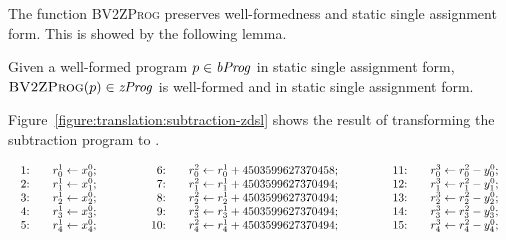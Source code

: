 The function \textsc{BV2ZProg} preserves well-formedness and static single assignment form. This is showed by the following lemma.

\begin{lemma}
  \label{lemma:bv2z-prog}
  Given a well-formed program $p \in \mathit{bProg}$ in static single assignment form, $\textsc{BV2ZProg}(p) \in \mathit{zProg}$ is well-formed and in static single assignment form.
\end{lemma}

Figure~\ref{figure:translation:subtraction-zdsl} shows the result of transforming the subtraction program  to \zdsl.

\begin{figure*}
  \centering
  $
  \begin{array}{lclcl}
    \begin{array}{rcl}
    \textmd{1:} && {r}^1_0 \leftarrow {x}^0_0; \\
    \textmd{2:} && {r}^1_1 \leftarrow {x}^0_1; \\
    \textmd{3:} && {r}^1_2 \leftarrow {x}^0_2; \\
    \textmd{4:} && {r}^1_3 \leftarrow {x}^0_3; \\
    \textmd{5:} && {r}^1_4 \leftarrow {x}^0_4; \\
    \end{array}
    &\hspace{.05\textwidth}&
    \begin{array}{rcl}
    \textmd{6:} &&
      {r}^2_0 \leftarrow {r}^1_0 + {4503599627370458}; \\
    \textmd{7:} &&
      {r}^2_1 \leftarrow {r}^1_1 + {4503599627370494}; \\
    \textmd{8:} &&
      {r}^2_2 \leftarrow {r}^1_2 + {4503599627370494}; \\
    \textmd{9:} &&
      {r}^2_3 \leftarrow {r}^1_3 + {4503599627370494}; \\
    \textmd{10:} &&
      {r}^2_4 \leftarrow {r}^1_4 + {4503599627370494};\\
    \end{array}
    &\hspace{.05\textwidth}&
    \begin{array}{rcl}
    \textmd{11:} && {r}^3_0 \leftarrow {r}^2_0 - {y}^0_0; \\
    \textmd{12:} && {r}^3_1 \leftarrow {r}^2_1 - {y}^0_1; \\
    \textmd{13:} && {r}^3_2 \leftarrow {r}^2_2 - {y}^0_2; \\
    \textmd{14:} && {r}^3_3 \leftarrow {r}^2_3 - {y}^0_3; \\
    \textmd{15:} && {r}^3_4 \leftarrow {r}^2_4 - {y}^0_4;
    \end{array}
  \end{array}
  $
  \caption{Subtraction \textsc{BV2ZProg}()}
  \label{figure:translation:subtraction-zdsl}
\end{figure*}


